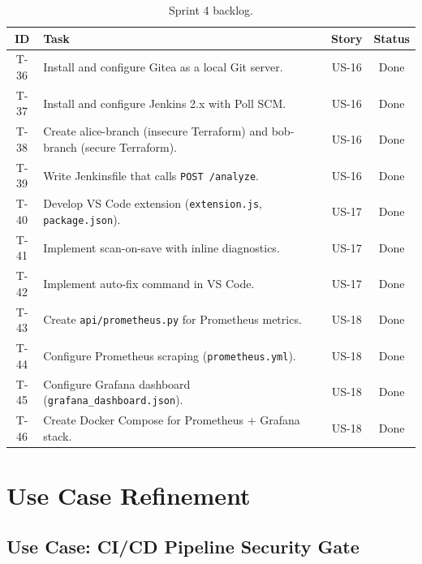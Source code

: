 \begin{table}[H]
\centering
\begin{tabularx}{\textwidth}{|c|X|c|c|}
\hline
\textbf{ID} & \textbf{Task} & \textbf{Story} & \textbf{Status} \\
\hline
T-36 & Install and configure Gitea as a local Git server. & US-16 & Done \\
\hline
T-37 & Install and configure Jenkins 2.x with Poll SCM. & US-16 & Done \\
\hline
T-38 & Create alice-branch (insecure Terraform) and bob-branch (secure Terraform). & US-16 & Done \\
\hline
T-39 & Write Jenkinsfile that calls \texttt{POST /analyze}. & US-16 & Done \\
\hline
T-40 & Develop VS Code extension (\texttt{extension.js}, \texttt{package.json}). & US-17 & Done \\
\hline
T-41 & Implement scan-on-save with inline diagnostics. & US-17 & Done \\
\hline
T-42 & Implement auto-fix command in VS Code. & US-17 & Done \\
\hline
T-43 & Create \texttt{api/prometheus.py} for Prometheus metrics. & US-18 & Done \\
\hline
T-44 & Configure Prometheus scraping (\texttt{prometheus.yml}). & US-18 & Done \\
\hline
T-45 & Configure Grafana dashboard (\texttt{grafana\_dashboard.json}). & US-18 & Done \\
\hline
T-46 & Create Docker Compose for Prometheus + Grafana stack. & US-18 & Done \\
\hline
\end{tabularx}
\caption{Sprint 4 backlog.}
\label{tab:s4-backlog}
\end{table}


\section{Use Case Refinement}

\subsection{Use Case: CI/CD Pipeline Security Gate}

